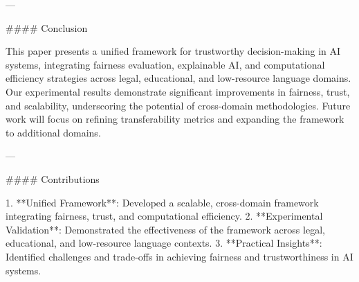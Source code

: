 ---

#### Conclusion  

This paper presents a unified framework for trustworthy decision-making in AI systems, integrating fairness evaluation, explainable AI, and computational efficiency strategies across legal, educational, and low-resource language domains. Our experimental results demonstrate significant improvements in fairness, trust, and scalability, underscoring the potential of cross-domain methodologies. Future work will focus on refining transferability metrics and expanding the framework to additional domains.

---

#### Contributions  

1. **Unified Framework**: Developed a scalable, cross-domain framework integrating fairness, trust, and computational efficiency.  
2. **Experimental Validation**: Demonstrated the effectiveness of the framework across legal, educational, and low-resource language contexts.  
3. **Practical Insights**: Identified challenges and trade-offs in achieving fairness and trustworthiness in AI systems.  